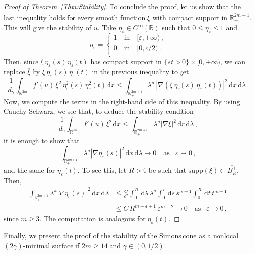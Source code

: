 \documentclass[12pt,reqno]{amsart}
\theoremstyle{definition}
\theoremstyle{remark}
\newcommand{\con}[1]{\mathbb{#1}}
\newcommand{\R}{\con{R}} %
\newcommand{\s}{\gamma}
\renewcommand{\d}{\,\mathrm{d}} %
\numberwithin{equation}{section}
\begin{document}
\begin{proof}[Proof of Theorem~\ref{Thm:Stability}]
To conclude the proof, let us show that the last inequality holds for every smooth function $\xi$ with compact support in $\overline{\R^{2m+1}_+}$. This will give the stability of $u$. Take $\eta_\varepsilon\in C^\infty(\R)$ such that $0\leq \eta_\varepsilon \leq 1$ and
$$ \eta_\varepsilon = \begin{cases}
1 \ \ \ \text{ in } \ \ \ [\varepsilon, +\infty)\,,\\
0 \ \ \ \text{ in } \ \ \ [0, \varepsilon/2)\,.\\
\end{cases} $$
Then, since $\xi\,\eta_\varepsilon(s)\,\eta_\varepsilon(t)$ has compact support in $\{st>0\}\times[0,+\infty)$, we can replace $\overline{\xi}$ by $\xi\,\eta_\varepsilon(s)\,\eta_\varepsilon(t)$ in the previous inequality to get
$$
\frac{1}{d_\s}\int_{\R^{2m}} f'(u)\,\xi^2\,\eta_\varepsilon^2(s)\,\eta_\varepsilon^2(t) \d x \leq \int_{\R^{2m+1}_+} \lambda^a\,|\nabla (\xi\,\eta_\varepsilon(s)\,\eta_\varepsilon(t))|^2 \d x \d \lambda\,. $$
Now, we compute the terms in the right-hand side of this inequality. By using Cauchy-Schwarz, we see that, to deduce the stability condition 
$$
\frac{1}{d_\s}\int_{\R^{2m}} f'(u)\,\xi^2 \d x  
\leq \int_{\R^{2m+1}_+} \lambda^a |\nabla \xi|^2  \d x \d \lambda\,,
$$
it is enough to show that
$$ \int_{\R^{2m+1}_+} \lambda^a|\nabla\eta_\varepsilon(s)|^2 \d x \d \lambda  \to 0 \ \ \ \text{ as } \ \ \varepsilon \to 0\,,$$
and the same for $\eta_\varepsilon(t)$. To see this, let $R>0$ be such that $\text{supp}(\xi)\subset \overline{B_R^+}$. Then,
\begin{align*}
\int_{\R^{2m+1}_+} \lambda^a|\nabla\eta_\varepsilon(s)|^2 \d x \d \lambda &\leq \frac{C}{\varepsilon^2} \int_0^R \d \lambda \, \lambda^a \int_0^\varepsilon \d s \, s^{m-1} \int_0^R \d t \,t^{m-1} \\
&\leq C\,R^{m+a+1}\,\varepsilon^{m-2} \to 0 \ \ \ \text{ as } \ \ \varepsilon \to 0\,,
\end{align*}
since $m\geq 3$. The computation is analogous for $\eta_\varepsilon(t)$.
\end{proof}

Finally, we present the proof of the stability of the Simons cone as a nonlocal $(2\s)$-minimal surface if $2m\geq 14$ and $\s\in(0,1/2)$.
\end{document}
